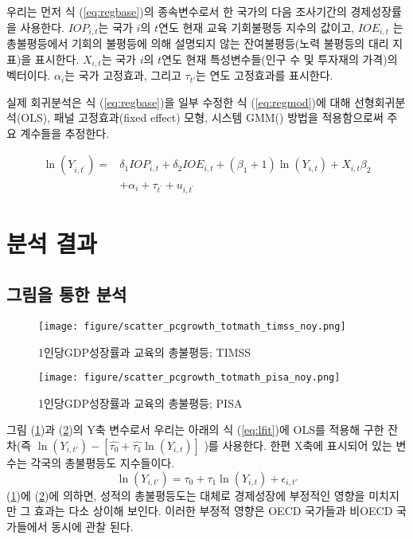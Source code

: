 우리는 먼저 식 (\ref{eq:regbase})의 종속변수로서 한 국가의 다음 조사기간의 경제성장률을 사용한다. 
$IOP_{i,t}$는 국가 $i$의 $t$연도 현재 교육 기회불평등 지수의 값이고, $IOE_{i,t}$ 는 총불평등에서 기회의 불평등에 의해 설명되지 않는 잔여불평등(노력 불평등의 대리 지표)을 표시한다. $X_{i,t}$는 국가 $i$의 $t$연도 현재 특성변수들(인구 수 및 투자재의 가격)의 벡터이다. $\alpha _i$는 국가 고정효과, 그리고 $\tau _{t'}$는 연도 고정효과를 표시한다.

실제 회귀분석은 식 (\ref{eq:regbase})을 일부 수정한 식 (\ref{eq:regmod})에 대해 선형회귀분석(OLS), 패널 고정효과(fixed effect) 모형, 시스템 GMM(\cite{bnb98}) 방법을 적용함으로써 주요 계수들을 추정한다.

\begin{equation}
 \begin{aligned}
 \ln \left(Y_{i, t^{\prime}}\right)=& \delta_{1} I O P_{i, t}+\delta_{2} I O E_{i, t}+\left(\beta_{1}+1\right) \ln \left(Y_{i, t}\right)+X_{i, t} \beta_{2} \\
 &+\alpha_{i}+\tau_{t^{\prime}}+u_{i, t^{\prime}}
 \end{aligned}
 \label{eq:regmod}
\end{equation}

\section{분석 결과}
\subsection{그림을 통한 분석}

\begin{figure}
    \centering
    \texttt{[image: figure/scatter\_pcgrowth\_totmath\_timss\_noy.png]}
    \caption{1인당GDP성장률과 교육의 총불평등; TIMSS}
    \label{fig:scatter_timss_pcgrowth_bjtmath_noy}
\end{figure}


\begin{figure}
    \centering
    \texttt{[image: figure/scatter\_pcgrowth\_totmath\_pisa\_noy.png]}
    \caption{1인당GDP성장률과 교육의 총불평등; PISA}
    \label{fig:scatter_pisa_pcgrowth_bjtmath_noy}
\end{figure}

그림 (\ref{fig:scatter_timss_pcgrowth_bjtmath_noy})과 (\ref{fig:scatter_pisa_pcgrowth_bjtmath_noy})의 Y축 변수로서 우리는 아래의 식 (\ref{eq:lfit})에 OLS를 적용해 구한 잔차(즉 $\ln \left(Y_{i, t'}\right)-\left[\widehat{\tau_{0}}+\widehat{\tau_{1}} \ln \left(Y_{i, t}\right)\right]$ )를 사용한다. 
한편 X축에 표시되어 있는 변수는 각국의 총불평등도 지수들이다.
\begin{equation}
\label{eq:lfit}
\ln \left(Y_{i, t'}\right)=\tau_{0}+\tau_{1} \ln \left(Y_{i, t}\right)+\epsilon_{i, t'}
\end{equation}
(\ref{fig:scatter_timss_pcgrowth_bjtmath_noy})에 (\ref{fig:scatter_pisa_pcgrowth_bjtmath_noy})에 의하면, 성적의 총불평등도는 대체로 경제성장에 부정적인 영향을 미치지만 그 효과는 다소 상이해 보인다.
이러한 부정적 영향은 OECD 국가들과 비OECD 국가들에서 동시에 관찰 된다.

